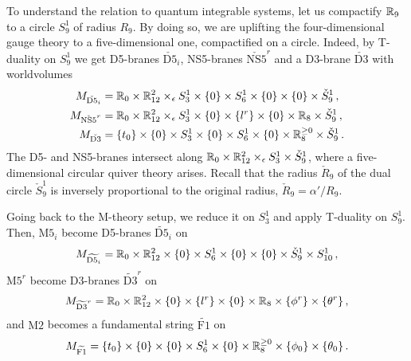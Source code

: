 To understand the relation to quantum integrable systems, let us
compactify $\mathbb{R}_9$ to a circle $S^1_9$ of radius $R_9$.  By doing so,
we are uplifting the four-dimensional gauge theory to a
five-dimensional one, compactified on a circle.  Indeed, by T-duality
on $S^1_9$ we get D5-branes $\check{\mathrm{D5}}_i$, NS5-branes
$\check{\mathrm{NS5}}^r$ and a D3-brane $\check{\mathrm{D3}}$ with
worldvolumes
\begin{align}
  \label{ea:M-D5}
  M_{\check{\mathrm{D5}}_i}
  &=
  \mathbb{R}_0 \times \mathbb{R}^2_{12} \times_\epsilon S^1_3 \times \{0\}
  \times S^1_6 \times \{0\} \times \{0\} \times \check S^1_9 \,,
  \\
  \label{ea:M-NS5}
  M_{\check{\mathrm{NS5}}^r}
  &=
  \mathbb{R}_0 \times \mathbb{R}^2_{12} \times_\epsilon S^1_3 \times \{0\}
  \times \{l^r\} \times \{0\} \times \mathbb{R}_8 \times \check S^1_9 \,,
  \\
  \label{ea:M-D3}
  M_{\check{\mathrm{D3}}}
  &= 
  \{t_0\} \times \{0\} \times S^1_3 \times \{0\}
  \times S^1_6 \times \{0\} \times \mathbb{R}^{\geq0}_8
  \times \check S^1_9 \,.
\end{align}
The D5- and NS5-branes intersect along
$\mathbb{R}_0 \times \mathbb{R}^2_{12} \times_\epsilon S^1_3 \times \check S^1_9$, where a
five-dimensional circular quiver theory arises.  Recall that the
radius $\check{R}_9$ of the dual circle $\check{S}^1_9$ is inversely
proportional to the original radius, $\check{R}_9 = \alpha'/R_9$.

Going back to the M-theory setup, we reduce it on $S^1_3$ and apply
T-duality on $S^1_9$.  Then, $\mathrm{M5}_i$ become D5-branes
$\widetilde{\mathrm{D5}}_i$ on
\begin{equation}
  M_{\widetilde{\mathrm{D5}_i}}
  =
  \mathbb{R}_0 \times \mathbb{R}^2_{12} \times \{0\} \times S^1_6
  \times \{0\} \times \{0\} \times \check{S}^1_9 \times S^1_{10} \,,
\end{equation}
$\mathrm{M5}^r$ become D3-branes $\widetilde{\mathrm{D3}}^r$ on
\begin{equation}
  M_{\widetilde{\mathrm{D3}}^r}
  =
  \mathbb{R}_0 \times \mathbb{R}^2_{12} \times \{0\} \times \{l^r\}
  \times \{0\} \times \mathbb{R}_8 \times \{\phi^r\} \times \{\theta^r\} \,,
\end{equation}
and $\mathrm{M2}$ becomes a fundamental string $\widetilde{\mathrm{F1}}$ on
\begin{equation}
  M_{\widetilde{\mathrm{F1}}}
  =
  \{t_0\} \times \{0\} \times \{0\}
  \times S^1_6 \times \{0\} \times \mathbb{R}^{\geq0}_8
  \times \{\phi_0\} \times \{\theta_0\} \,.
\end{equation}





